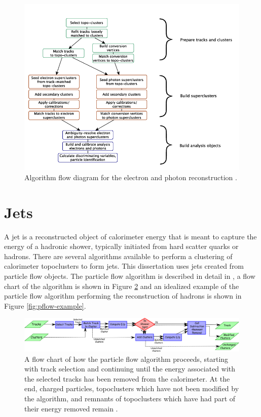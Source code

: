	\begin{figure}[!ht]
	\centering
	\includegraphics[width=.65\textwidth,keepaspectratio=true]{chapters/chapter5_eventreconnstruction/images/egamma_flow_01.png}
	\caption{\label{fig:egamma-reco} Algorithm flow diagram for the electron and photon reconstruction \cite{electron-perf}.}
	\end{figure}

	\section{Jets}\label{sec:reco-jets}
	A jet is a reconstructed object of calorimeter energy that is meant to capture the energy of a hadronic shower, typically initiated from hard scatter quarks or hadrons. There are several algorithms available to perform a clustering of calorimeter topoclusters to form jets. This dissertation uses jets created from particle flow objects. The particle flow algorithm is described in detail in \cite{pflow}, a flow chart of the algorithm is shown in Figure \ref{fig:pflow-flowchart} and an idealized example of the particle flow algorithm performing the reconstruction of hadrons is shown in Figure \ref{fig:pflow-example}. 

	\begin{figure}[!ht]
	\centering
	\includegraphics[width=\textwidth,keepaspectratio=true]{chapters/chapter5_eventreconnstruction/images/pflow_flow_chart.png}
	\caption{\label{fig:pflow-flowchart} A flow chart of how the particle flow algorithm proceeds, starting with track selection and continuing until the energy associated with the selected tracks has been removed from the calorimeter. At the end, charged particles, topoclusters which have not been modified by the algorithm, and remnants of topoclusters which have had part of their energy removed remain \cite{pflow}.}
	\end{figure}

